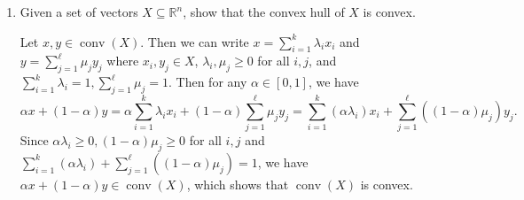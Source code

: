 \documentclass[11pt]{article}
\institute{\'Ecole Polytechnique F\'ed\'erale de Lausanne}
\DeclareMathOperator{\conv}{conv}
\newcommand{\setR}{\mathbb{R}}
\renewcommand{\leq}{\leqslant}
\renewcommand{\geq}{\geqslant}
\begin{document}
\makeheader

\begin{enumerate}[1)]

\item \label{convex-hull}
Given a set of vectors $X \subseteq \setR^n$, show that the convex hull of $X$ is convex. 

\begin{solution}
Let $x, y \in \conv(X)$. Then we can write $x = \displaystyle\sum_{i=1}^k \lambda_i x_i$ and $y = \displaystyle\sum_{j=1}^\ell \mu_j y_j$ where $x_i, y_j \in X$, $\lambda_i, \mu_j \geq 0$ for all $i,j$, and $\displaystyle\sum_{i=1}^k \lambda_i = 1, \displaystyle\sum_{j=1}^\ell \mu_j = 1$. Then for any $\alpha \in [0,1]$, we have
\[
\alpha x + (1-\alpha) y = \alpha \sum_{i=1}^k \lambda_i x_i + (1-\alpha) \sum_{j=1}^\ell \mu_j y_j = \sum_{i=1}^k (\alpha \lambda_i) x_i + \sum_{j=1}^\ell ((1-\alpha) \mu_j) y_j.
\]
Since $\alpha \lambda_i\geq 0, (1-\alpha) \mu_j \geq 0$ for all $i,j$ and $\displaystyle\sum_{i=1}^k (\alpha \lambda_i) + \displaystyle\sum_{j=1}^\ell ((1-\alpha) \mu_j) = 1$, we have $\alpha x + (1-\alpha) y \in \conv(X)$, which shows that $\conv(X)$ is convex.
\end{solution}

  
  
  
  
  

\end{enumerate}
\end{document}
